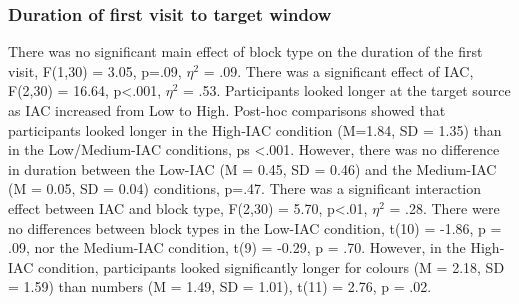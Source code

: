 \subsubsection{Duration of first visit to target window}
There was no significant main effect of block type on the duration of the first visit, F(1,30) = 3.05, p=.09, $\eta^2$  = .09. There was a significant effect of IAC, F(2,30) = 16.64, p<.001, $\eta^2$  = .53. Participants looked longer at the target source as IAC increased from Low to High. Post-hoc comparisons showed that participants looked longer in the High-IAC condition (M=1.84, SD = 1.35) than in the Low/Medium-IAC conditions, ps <.001. However, there was no difference in duration between the Low-IAC (M = 0.45, SD = 0.46) and the Medium-IAC (M = 0.05, SD = 0.04) conditions, p=.47. There was a significant interaction effect between IAC and block type, F(2,30) = 5.70, p<.01, $\eta^2$  = .28. There were no differences between block types in the Low-IAC condition, t(10) = -1.86, p = .09, nor the Medium-IAC condition, t(9) = -0.29, p = .70. However, in the High-IAC condition, participants looked significantly longer for colours (M = 2.18, SD = 1.59) than numbers (M = 1.49, SD = 1.01), t(11) = 2.76, p = .02.

